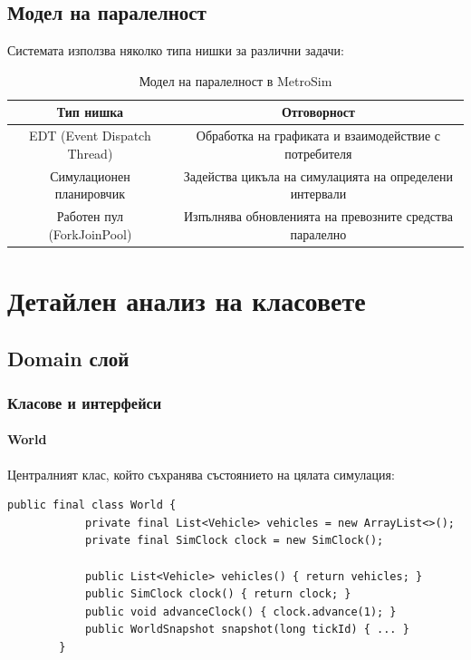 \documentclass{article}
\begin{document}
	\subsection{Модел на паралелност}
	
	Системата използва няколко типа нишки за различни задачи:
	
	\begin{table}[H]
		\centering
		\begin{tabular}{|c|c|}
			\hline
			\textbf{Тип нишка} & \textbf{Отговорност} \\
			\hline
			EDT (Event Dispatch Thread) & Обработка на графиката и взаимодействие с потребителя \\
			\hline
			Симулационен планировчик & Задейства цикъла на симулацията на определени интервали \\
			\hline
			Работен пул (ForkJoinPool) & Изпълнява обновленията на превозните средства паралелно \\
			\hline
		\end{tabular}
		\caption{Модел на паралелност в MetroSim}
	\end{table}
	
	\section{Детайлен анализ на класовете}
	
	\subsection{Domain слой}
	
	\subsubsection{Класове и интерфейси}
	
	\paragraph{World}
	Централният клас, който съхранява състоянието на цялата симулация:
	
	\begin{lstlisting}[caption=Основни методи на класа World]
		public final class World {
			private final List<Vehicle> vehicles = new ArrayList<>();
			private final SimClock clock = new SimClock();
			
			public List<Vehicle> vehicles() { return vehicles; }
			public SimClock clock() { return clock; }
			public void advanceClock() { clock.advance(1); }
			public WorldSnapshot snapshot(long tickId) { ... }
		}
	\end{lstlisting}
	
\end{document}
